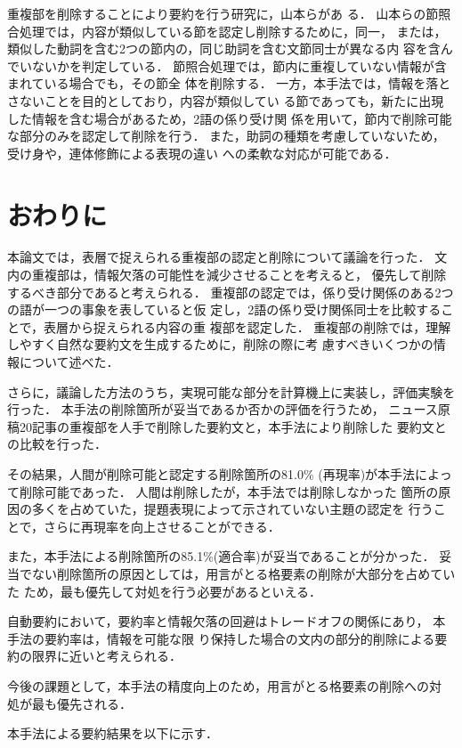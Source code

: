 重複部を削除することにより要約を行う研究に，山本ら\cite{yamamoto96}があ
る．
山本らの節照合処理では，内容が類似している節を認定し削除するために，同一，
または，類似した動詞を含む2つの節内の，同じ助詞を含む文節同士が異なる内
容を含んでいないかを判定している．
節照合処理では，節内に重複していない情報が含まれている場合でも，その節全
体を削除する．
一方，本手法では，情報を落とさないことを目的としており，内容が類似してい
る節であっても，新たに出現した情報を含む場合があるため，2語の係り受け関
係を用いて，節内で削除可能な部分のみを認定して削除を行う．
また，助詞の種類を考慮していないため，受け身や，連体修飾による表現の違い
への柔軟な対応が可能である．

\section{おわりに}
本論文では，表層で捉えられる重複部の認定と削除について議論を行った．
文内の重複部は，情報欠落の可能性を減少させることを考えると，
優先して削除するべき部分であると考えられる．
重複部の認定では，係り受け関係のある2つの語が一つの事象を表していると仮
定し，2語の係り受け関係同士を比較することで，表層から捉えられる内容の重
複部を認定した．
重複部の削除では，理解しやすく自然な要約文を生成するために，削除の際に考
慮すべきいくつかの情報について述べた．

さらに，議論した方法のうち，実現可能な部分を計算機上に実装し，評価実験を
行った．
本手法の削除箇所が妥当であるか否かの評価を行うため，
ニュース原稿20記事の重複部を人手で削除した要約文と，本手法により削除した
要約文との比較を行った．

その結果，人間が削除可能と認定する削除箇所の81.0\%
(再現率)が本手法によって削除可能であった．
人間は削除したが，本手法では削除しなかった
箇所の原因の多くを占めていた，提題表現によって示されていない主題の認定を
行うことで，さらに再現率を向上させることができる．

また，本手法による削除箇所の85.1\%(適合率)が妥当であることが分かった．
妥当でない削除箇所の原因としては，用言がとる格要素の削除が大部分を占めていた
ため，最も優先して対処を行う必要があるといえる．

自動要約において，要約率と情報欠落の回避はトレードオフの関係にあり，
本手法の要約率は，情報を可能な限
り保持した場合の文内の部分的削除による要約の限界に近いと考えられる．

今後の課題として，本手法の精度向上のため，用言がとる格要素の削除への対
処が最も優先される．


\appendix

本手法による要約結果を以下に示す．

